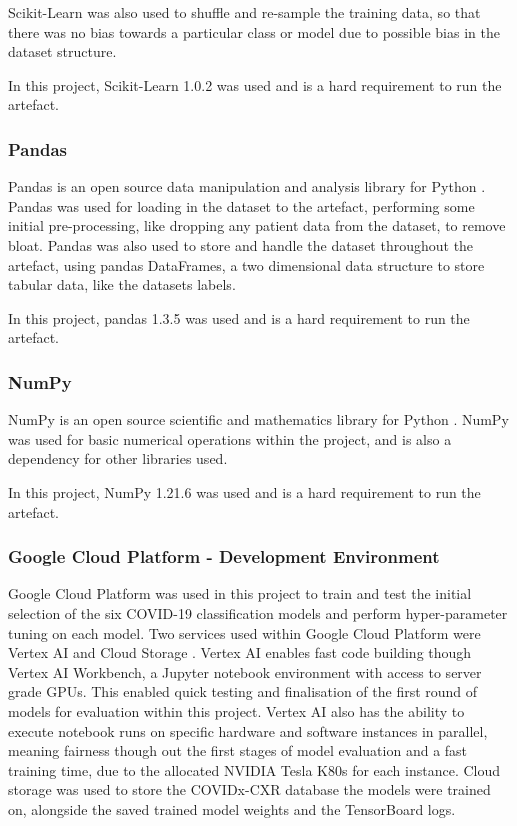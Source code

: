 Scikit-Learn was also used to shuffle and re-sample the training data, so that there was no bias towards a particular class or model due to possible bias in the dataset structure.

In this project, Scikit-Learn 1.0.2 was used and is a hard requirement to run the artefact.

\subsubsection{Pandas}
Pandas is an open source data manipulation and analysis library for Python \citep{pandasPy63:online}. Pandas was used for loading in the dataset to the artefact, performing some initial pre-processing, like dropping any patient data from the dataset, to remove bloat. Pandas was also used to store and handle the dataset throughout the artefact, using pandas DataFrames, a two dimensional data structure to store tabular data, like the datasets labels.

In this project, pandas 1.3.5 was used and is a hard requirement to run the artefact.

\subsubsection{NumPy}
NumPy is an open source scientific and mathematics library for Python \citep{NumPy90:online}. NumPy was used for basic numerical operations within the project, and is also a dependency for other libraries used. 

In this project, NumPy 1.21.6 was used and is a hard requirement to run the artefact.

\subsubsection{Google Cloud Platform - Development Environment}
Google Cloud Platform was used in this project to train and test the initial selection of the six COVID-19 classification models and perform hyper-parameter tuning on each model. Two services used within Google Cloud Platform were Vertex AI \citep{VertexAI57:online} and Cloud Storage \citep{CloudSto72:online}. Vertex AI enables fast code building though Vertex AI Workbench, a Jupyter notebook environment with access to server grade GPUs. This enabled quick testing and finalisation of the first round of models for evaluation within this project. Vertex AI also has the ability to execute notebook runs on specific hardware and software instances in parallel, meaning fairness though out the first stages of model evaluation and a fast training time, due to the allocated NVIDIA Tesla K80s for each instance. Cloud storage was used to store the COVIDx-CXR database the models were trained on, alongside the saved trained model weights and the TensorBoard logs.


